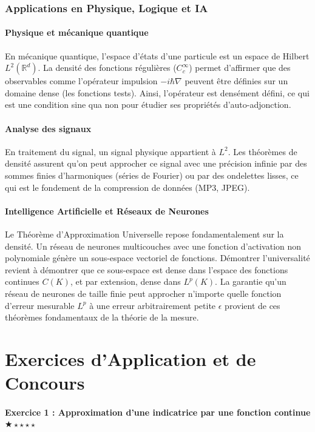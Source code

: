 \documentclass[11pt,a4paper]{article}
\begin{document}
\section{Applications en Physique, Logique et IA}

\subsection{Physique et mécanique quantique}
En mécanique quantique, l'espace d'états d'une particule est un espace de Hilbert $L^2(\mathbb{R}^d)$. La densité des fonctions régulières ($C_c^\infty$) permet d'affirmer que des observables comme l'opérateur impulsion $-i\hbar\nabla$ peuvent être définies sur un domaine dense (les fonctions tests). Ainsi, l'opérateur est densément défini, ce qui est une condition sine qua non pour étudier ses propriétés d'auto-adjonction.

\subsection{Analyse des signaux}
En traitement du signal, un signal physique appartient à $L^2$. Les théorèmes de densité assurent qu'on peut approcher ce signal avec une précision infinie par des sommes finies d'harmoniques (séries de Fourier) ou par des ondelettes lisses, ce qui est le fondement de la compression de données (MP3, JPEG).

\subsection{Intelligence Artificielle et Réseaux de Neurones}
Le Théorème d'Approximation Universelle repose fondamentalement sur la densité. Un réseau de neurones multicouches avec une fonction d'activation non polynomiale génère un sous-espace vectoriel de fonctions. Démontrer l'universalité revient à démontrer que ce sous-espace est dense dans l'espace des fonctions continues $C(K)$, et par extension, dense dans $L^p(K)$.
La garantie qu'un réseau de neurones de taille finie peut approcher n'importe quelle fonction d'erreur mesurable $L^p$ à une erreur arbitrairement petite $\epsilon$ provient de ces théorèmes fondamentaux de la théorie de la mesure.



\newpage
\part{Exercices d'Application et de Concours}
\subsection*{Exercice 1 : Approximation d'une indicatrice par une fonction continue \quad $\bigstar\star\star\star\star$}
\end{document}
